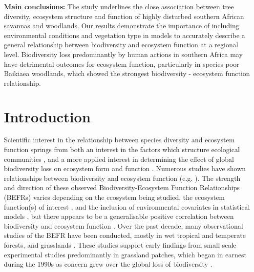 \documentclass[11pt,a4paper]{article}
\begin{document}
\textbf{Main conclusions:} The study underlines the close association between tree diversity, ecosystem structure and function of highly disturbed southern African savannas and woodlands. Our results demonstrate the importance of including environmental conditions and vegetation type in models to accurately describe a general relationship between biodiversity and ecosystem function at a regional level. Biodiversity loss predominantly by human actions in southern Africa may have detrimental outcomes for ecosystem function, particularly in species poor Baikiaea woodlands, which showed the strongest biodiversity - ecosystem function relationship.


\section{Introduction}

Scientific interest in the relationship between species diversity and ecosystem function springs from both an interest in the factors which structure ecological communities \citep{}, and a more applied interest in determining the effect of global biodiversity loss on ecosystem form and function \citep{}. Numerous studies have shown relationships between biodiversity and ecosystem function (e.g. \citealt{Liang2016, Hooper2012, Cardinale2009}). The strength and direction of these observed Biodiversity-Ecosystem Function Relationships (BEFRs) varies depending on the ecosystem being studied, the ecosystem function(s) of interest \citep{Hector2007}, and the inclusion of environmental covariates in statistical models \citep{Vila2005}, but there appears to be a generalisable positive correlation between biodiversity and ecosystem function \citep{Liang2016}. Over the past decade, many observational studies of the BEFR have been conducted, mostly in wet tropical and temperate forests, and grasslands \citep{Chen2011}. These studies support early findings from small scale experimental studies predominantly in grassland patches, which began in earnest during the 1990s as concern grew over the global loss of biodiversity \citep{Tilman1994, Tilman2014}.
\end{document}
